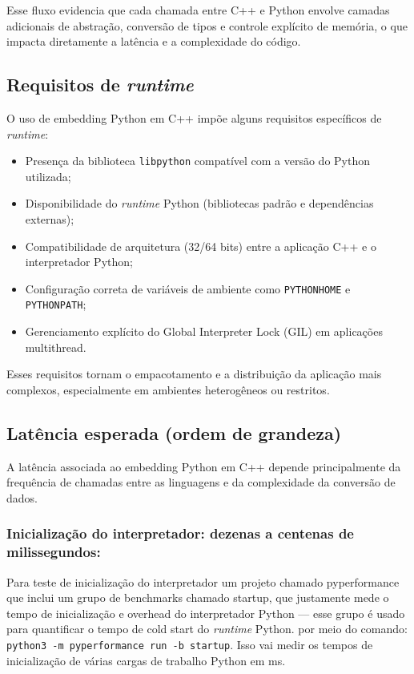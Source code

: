 Esse fluxo evidencia que cada chamada entre C++ e Python envolve camadas adicionais de abstração, conversão de tipos e controle explícito de memória, o que impacta diretamente a latência e a complexidade do código.

\subsection{Requisitos de \emph{runtime}}

O uso de embedding Python em C++ impõe alguns requisitos específicos de \emph{runtime}:

\begin{itemize}
    \item Presença da biblioteca \texttt{libpython} compatível com a versão do Python utilizada;
    \item Disponibilidade do \emph{runtime} Python (bibliotecas padrão e dependências externas);
    \item Compatibilidade de arquitetura (32/64 bits) entre a aplicação C++ e o interpretador Python;
    \item Configuração correta de variáveis de ambiente como \texttt{PYTHONHOME} e \texttt{PYTHONPATH};
    \item Gerenciamento explícito do Global Interpreter Lock (GIL) em aplicações multithread.
\end{itemize}

Esses requisitos tornam o empacotamento e a distribuição da aplicação mais complexos, especialmente em ambientes heterogêneos ou restritos.

\subsection{Latência esperada (ordem de grandeza)}

A latência associada ao embedding Python em C++ depende principalmente da frequência de chamadas entre as linguagens e da complexidade da conversão de dados. 

    \subsubsection{ Inicialização do interpretador: dezenas a centenas de milissegundos:}
Para teste de inicialização do interpretador um projeto chamado pyperformance que inclui um grupo de benchmarks chamado startup, que justamente mede o tempo de inicialização e overhead do interpretador Python — esse grupo é usado para quantificar o tempo de cold start do \emph{runtime} Python. por meio do comando: \texttt{python3 -m pyperformance run -b startup}. Isso vai medir os tempos de inicialização de várias cargas de trabalho Python em ms.
  
